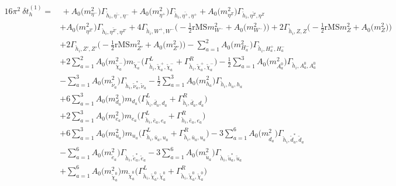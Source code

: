 \begin{align} 
16\pi^2 \ \delta t^{(1)}_{h} = & \, +{A_0\Big(m^2_{\eta^-}\Big)} {\Gamma_{\check{h}_{{i}},\bar{\eta^-},\eta^-}} +{A_0\Big(m^2_{\eta^+}\Big)} {\Gamma_{\check{h}_{{i}},\bar{\eta^+},\eta^+}} +{A_0\Big(m^2_{\eta^Z}\Big)} {\Gamma_{\check{h}_{{i}},\bar{\eta^Z},\eta^Z}} \nonumber \\ 
 &+{A_0\Big(m^2_{\eta^{Z'}}\Big)} {\Gamma_{\check{h}_{{i}},\bar{\eta^{Z'}},\eta^{Z'}}} +4 {\Gamma_{\check{h}_{{i}},W^+,W^-}} \Big(-\frac{1}{2} \text{rMS} m^2_{W^-}  + {A_0\Big(m^2_{W^-}\Big)}\Big)+2 {\Gamma_{\check{h}_{{i}},Z,Z}} \Big(-\frac{1}{2} \text{rMS} m^2_{Z}  + {A_0\Big(m^2_{Z}\Big)}\Big)\nonumber \\ 
 &+2 {\Gamma_{\check{h}_{{i}},{Z'},{Z'}}} \Big(-\frac{1}{2} \text{rMS} m^2_{{Z'}}  + {A_0\Big(m^2_{{Z'}}\Big)}\Big)- \sum_{a=1}^{2}{A_0\Big(m^2_{H^-_{{a}}}\Big)} {\Gamma_{\check{h}_{{i}},H^+_{{a}},H^-_{{a}}}}  \nonumber \\ 
 &+2 \sum_{a=1}^{2}{A_0\Big(m^2_{\tilde{\chi}^-_{{a}}}\Big)} m_{\tilde{\chi}^-_{{a}}} \Big({\Gamma^L_{\check{h}_{{i}},\tilde{\chi}^+_{{a}},\tilde{\chi}^-_{{a}}}} + {\Gamma^R_{\check{h}_{{i}},\tilde{\chi}^+_{{a}},\tilde{\chi}^-_{{a}}}}\Big) -\frac{1}{2} \sum_{a=1}^{3}{A_0\Big(m^2_{A^0_{{a}}}\Big)} {\Gamma_{\check{h}_{{i}},A^0_{{a}},A^0_{{a}}}}  \nonumber \\ 
 &- \sum_{a=1}^{3}{A_0\Big(m^2_{\tilde{\nu}_{{a}}}\Big)} {\Gamma_{\check{h}_{{i}},\tilde{\nu}^*_{{a}},\tilde{\nu}_{{a}}}}  -\frac{1}{2} \sum_{a=1}^{3}{A_0\Big(m^2_{h_{{a}}}\Big)} {\Gamma_{\check{h}_{{i}},h_{{a}},h_{{a}}}}  \nonumber \\ 
 &+6 \sum_{a=1}^{3}{A_0\Big(m^2_{d_{{a}}}\Big)} m_{d_{{a}}} \Big({\Gamma^L_{\check{h}_{{i}},\bar{d}_{{a}},d_{{a}}}} + {\Gamma^R_{\check{h}_{{i}},\bar{d}_{{a}},d_{{a}}}}\Big) \nonumber \\ 
 &+2 \sum_{a=1}^{3}{A_0\Big(m^2_{e_{{a}}}\Big)} m_{e_{{a}}} \Big({\Gamma^L_{\check{h}_{{i}},\bar{e}_{{a}},e_{{a}}}} + {\Gamma^R_{\check{h}_{{i}},\bar{e}_{{a}},e_{{a}}}}\Big) \nonumber \\ 
 &+6 \sum_{a=1}^{3}{A_0\Big(m^2_{u_{{a}}}\Big)} m_{u_{{a}}} \Big({\Gamma^L_{\check{h}_{{i}},\bar{u}_{{a}},u_{{a}}}} + {\Gamma^R_{\check{h}_{{i}},\bar{u}_{{a}},u_{{a}}}}\Big) -3 \sum_{a=1}^{6}{A_0\Big(m^2_{\tilde{d}_{{a}}}\Big)} {\Gamma_{\check{h}_{{i}},\tilde{d}^*_{{a}},\tilde{d}_{{a}}}}  \nonumber \\ 
 &- \sum_{a=1}^{6}{A_0\Big(m^2_{\tilde{e}_{{a}}}\Big)} {\Gamma_{\check{h}_{{i}},\tilde{e}^*_{{a}},\tilde{e}_{{a}}}}  -3 \sum_{a=1}^{6}{A_0\Big(m^2_{\tilde{u}_{{a}}}\Big)} {\Gamma_{\check{h}_{{i}},\tilde{u}^*_{{a}},\tilde{u}_{{a}}}}  \nonumber \\ 
 &+\sum_{a=1}^{6}{A_0\Big(m^2_{\tilde{\chi}^0_{{a}}}\Big)} m_{\tilde{\chi}^0_{{a}}} \Big({\Gamma^L_{\check{h}_{{i}},\tilde{\chi}^0_{{a}},\tilde{\chi}^0_{{a}}}} + {\Gamma^R_{\check{h}_{{i}},\tilde{\chi}^0_{{a}},\tilde{\chi}^0_{{a}}}}\Big) 
\end{align} 
